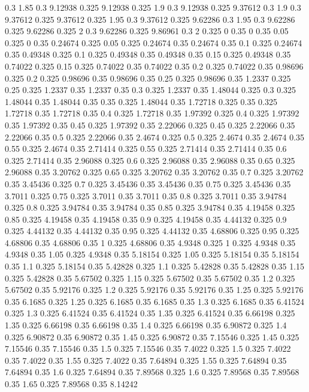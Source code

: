 0.3 1.85
0.3 9.12938
0.325 9.12938
0.325 1.9
0.3 9.12938
0.325 9.37612
0.3 1.9
0.3 9.37612
0.325 9.37612
0.325 1.95
0.3 9.37612
0.325 9.62286
0.3 1.95
0.3 9.62286
0.325 9.62286
0.325 2
0.3 9.62286
0.325 9.86961
0.3 2
0.325 0
0.35 0
0.35 0.05
0.325 0
0.35 0.24674
0.325 0.05
0.325 0.24674
0.35 0.24674
0.35 0.1
0.325 0.24674
0.35 0.49348
0.325 0.1
0.325 0.49348
0.35 0.49348
0.35 0.15
0.325 0.49348
0.35 0.74022
0.325 0.15
0.325 0.74022
0.35 0.74022
0.35 0.2
0.325 0.74022
0.35 0.98696
0.325 0.2
0.325 0.98696
0.35 0.98696
0.35 0.25
0.325 0.98696
0.35 1.2337
0.325 0.25
0.325 1.2337
0.35 1.2337
0.35 0.3
0.325 1.2337
0.35 1.48044
0.325 0.3
0.325 1.48044
0.35 1.48044
0.35 0.35
0.325 1.48044
0.35 1.72718
0.325 0.35
0.325 1.72718
0.35 1.72718
0.35 0.4
0.325 1.72718
0.35 1.97392
0.325 0.4
0.325 1.97392
0.35 1.97392
0.35 0.45
0.325 1.97392
0.35 2.22066
0.325 0.45
0.325 2.22066
0.35 2.22066
0.35 0.5
0.325 2.22066
0.35 2.4674
0.325 0.5
0.325 2.4674
0.35 2.4674
0.35 0.55
0.325 2.4674
0.35 2.71414
0.325 0.55
0.325 2.71414
0.35 2.71414
0.35 0.6
0.325 2.71414
0.35 2.96088
0.325 0.6
0.325 2.96088
0.35 2.96088
0.35 0.65
0.325 2.96088
0.35 3.20762
0.325 0.65
0.325 3.20762
0.35 3.20762
0.35 0.7
0.325 3.20762
0.35 3.45436
0.325 0.7
0.325 3.45436
0.35 3.45436
0.35 0.75
0.325 3.45436
0.35 3.7011
0.325 0.75
0.325 3.7011
0.35 3.7011
0.35 0.8
0.325 3.7011
0.35 3.94784
0.325 0.8
0.325 3.94784
0.35 3.94784
0.35 0.85
0.325 3.94784
0.35 4.19458
0.325 0.85
0.325 4.19458
0.35 4.19458
0.35 0.9
0.325 4.19458
0.35 4.44132
0.325 0.9
0.325 4.44132
0.35 4.44132
0.35 0.95
0.325 4.44132
0.35 4.68806
0.325 0.95
0.325 4.68806
0.35 4.68806
0.35 1
0.325 4.68806
0.35 4.9348
0.325 1
0.325 4.9348
0.35 4.9348
0.35 1.05
0.325 4.9348
0.35 5.18154
0.325 1.05
0.325 5.18154
0.35 5.18154
0.35 1.1
0.325 5.18154
0.35 5.42828
0.325 1.1
0.325 5.42828
0.35 5.42828
0.35 1.15
0.325 5.42828
0.35 5.67502
0.325 1.15
0.325 5.67502
0.35 5.67502
0.35 1.2
0.325 5.67502
0.35 5.92176
0.325 1.2
0.325 5.92176
0.35 5.92176
0.35 1.25
0.325 5.92176
0.35 6.1685
0.325 1.25
0.325 6.1685
0.35 6.1685
0.35 1.3
0.325 6.1685
0.35 6.41524
0.325 1.3
0.325 6.41524
0.35 6.41524
0.35 1.35
0.325 6.41524
0.35 6.66198
0.325 1.35
0.325 6.66198
0.35 6.66198
0.35 1.4
0.325 6.66198
0.35 6.90872
0.325 1.4
0.325 6.90872
0.35 6.90872
0.35 1.45
0.325 6.90872
0.35 7.15546
0.325 1.45
0.325 7.15546
0.35 7.15546
0.35 1.5
0.325 7.15546
0.35 7.4022
0.325 1.5
0.325 7.4022
0.35 7.4022
0.35 1.55
0.325 7.4022
0.35 7.64894
0.325 1.55
0.325 7.64894
0.35 7.64894
0.35 1.6
0.325 7.64894
0.35 7.89568
0.325 1.6
0.325 7.89568
0.35 7.89568
0.35 1.65
0.325 7.89568
0.35 8.14242
